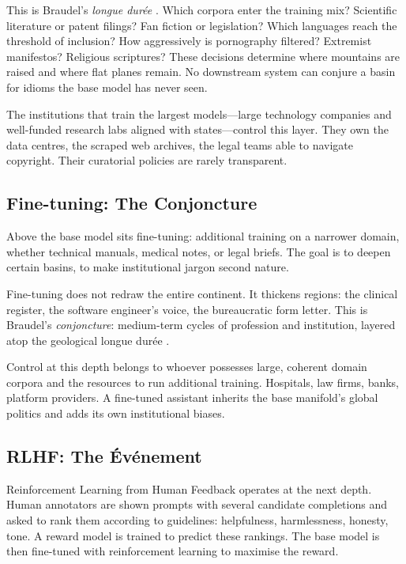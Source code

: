 \documentclass[12pt,a4paper]{article}
\begin{document}
This is Braudel's \emph{longue dur\'{e}e} \cite{braudel1980}. Which corpora enter the training mix? Scientific literature or patent filings? Fan fiction or legislation? Which languages reach the threshold of inclusion? How aggressively is pornography filtered? Extremist manifestos? Religious scriptures? These decisions determine where mountains are raised and where flat planes remain. No downstream system can conjure a basin for idioms the base model has never seen.

The institutions that train the largest models---large technology companies and well-funded research labs aligned with states---control this layer. They own the data centres, the scraped web archives, the legal teams able to navigate copyright. Their curatorial policies are rarely transparent.

\subsection{Fine-tuning: The Conjoncture}

Above the base model sits fine-tuning: additional training on a narrower domain, whether technical manuals, medical notes, or legal briefs. The goal is to deepen certain basins, to make institutional jargon second nature.

Fine-tuning does not redraw the entire continent. It thickens regions: the clinical register, the software engineer's voice, the bureaucratic form letter. This is Braudel's \emph{conjoncture}: medium-term cycles of profession and institution, layered atop the geological longue dur\'{e}e \cite{braudel1980}.

Control at this depth belongs to whoever possesses large, coherent domain corpora and the resources to run additional training. Hospitals, law firms, banks, platform providers. A fine-tuned assistant inherits the base manifold's global politics and adds its own institutional biases.

\subsection{RLHF: The \'{E}v\'{e}nement}

Reinforcement Learning from Human Feedback operates at the next depth. Human annotators are shown prompts with several candidate completions and asked to rank them according to guidelines: helpfulness, harmlessness, honesty, tone. A reward model is trained to predict these rankings. The base model is then fine-tuned with reinforcement learning to maximise the reward.
\end{document}
